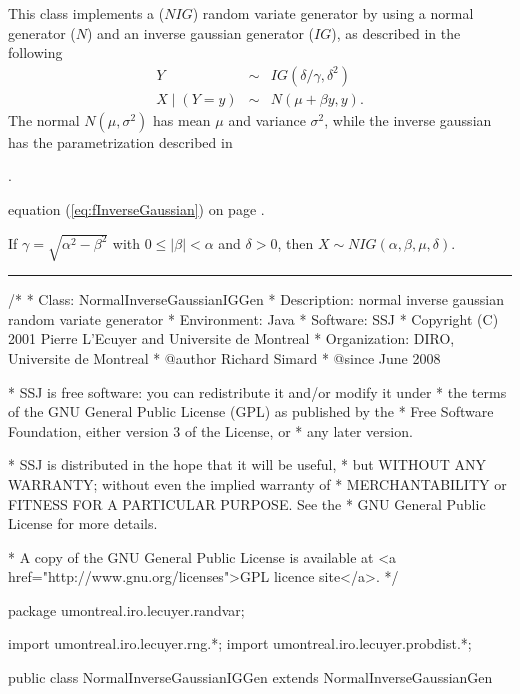

This class implements a \nig{} (${NIG}$) random variate generator by
using a normal generator ($N$) and an inverse gaussian generator ($IG$),
 as described in the following \cite{fWEB03a,fKAL07a}
\begin {eqnarray}
    Y  &\sim& {IG}(\delta/\gamma, \delta^2)    \label{nig2} \\
    X \mid (Y=y)  &\sim& N(\mu + \beta y, y).  \nonumber
\end {eqnarray}
The normal $N(\mu, \sigma^2)$ has mean $\mu$ and variance $\sigma^2$, while
the inverse gaussian has the parametrization described in%
\begin{htmlonly}
.
\end{htmlonly}
\begin{latexonly}%
equation (\ref{eq:fInverseGaussian}) on page \pageref{eq:fInverseGaussian}.
\end{latexonly}
If $\gamma = \sqrt{\alpha^2 - \beta^2}$ with $0 \le |\beta| < \alpha$ and
$\delta >0$, then $X \sim {NIG}(\alpha, \beta, \mu, \delta)$. 

\bigskip\hrule

\begin{code}
\begin{hide}
/*
 * Class:        NormalInverseGaussianIGGen
 * Description:  normal inverse gaussian random variate generator
 * Environment:  Java
 * Software:     SSJ 
 * Copyright (C) 2001  Pierre L'Ecuyer and Universite de Montreal
 * Organization: DIRO, Universite de Montreal
 * @author       Richard Simard
 * @since        June 2008

 * SSJ is free software: you can redistribute it and/or modify it under
 * the terms of the GNU General Public License (GPL) as published by the
 * Free Software Foundation, either version 3 of the License, or
 * any later version.

 * SSJ is distributed in the hope that it will be useful,
 * but WITHOUT ANY WARRANTY; without even the implied warranty of
 * MERCHANTABILITY or FITNESS FOR A PARTICULAR PURPOSE.  See the
 * GNU General Public License for more details.

 * A copy of the GNU General Public License is available at
   <a href="http://www.gnu.org/licenses">GPL licence site</a>.
 */
\end{hide}
package umontreal.iro.lecuyer.randvar;\begin{hide}
import umontreal.iro.lecuyer.rng.*;
import umontreal.iro.lecuyer.probdist.*;
\end{hide}

public class NormalInverseGaussianIGGen extends NormalInverseGaussianGen \begin{hide} {
   private NormalGen genN;
   private InverseGaussianGen genIG;
\end{hide}\end{code}

